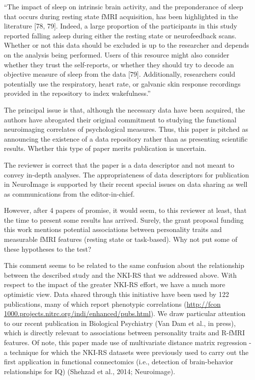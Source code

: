 \documentclass{article}
\newcommand{\RESPONSE}[1]{\textcolor{responseblue}{#1}}
\begin{document}
\RESPONSE{``The impact of sleep on intrinsic brain activity, and the preponderance of sleep that occurs during resting state fMRI acquisition, has been highlighted in the literature  [78, 79]. Indeed, a large proportion of the participants in this  study  reported  falling  asleep during either the resting state or neurofeedback scans. Whether or not this  data should be excluded is up to the researcher and depends on the analysis being performed. Users of this resource might also consider whether they trust the self-reports, or whether they should try to decode an objective measure of sleep from the data [79]. Additionally, researchers could potentially use the respiratory, heart rate, or galvanic skin response recordings provided in the repository to index wakefulness.''}

The principal issue is that, although the necessary data have been acquired, the authors have abrogated their original commitment to studying the functional neuroimaging correlates of psychological measures. Thus, this paper is pitched as announcing the existence of a data repository rather than as presenting scientific results. Whether this type of paper merits publication is uncertain.

\RESPONSE{The reviewer is correct that the paper is a data descriptor and not meant to convey in-depth analyses. The appropriateness of data descriptors for publication in NeuroImage is supported by their recent special issues on data sharing as well as communications from the editor-in-chief.}

However, after 4 papers of promise, it would seem, to this reviewer at least, that the time to present some results has arrived. Surely, the grant proposal funding this work mentions potential associations between
personality traits and measurable fMRI features (resting state or task-based). Why not put some of these hypotheses to the test? 

\RESPONSE{This comment seems to be related to the same confusion about the relationship between the described study and the NKI-RS that we addressed above. With respect to the impact of the greater NKI-RS effort, we have a much more optimistic view. Data shared through this initiative have been used by 122 publications, many of which report phenotypic correlations (\url{http://fcon 1000.projects.nitrc.org/indi/enhanced/pubs.html}). We draw particular attention to our recent publication in Biological Psychiatry (Van Dam et al., in press), which is directly relevant to associations between personality traits and R-fMRI features. Of note, this paper made use of multivariate distance matrix regression - a technique for which the NKI-RS datasets were previously used to carry out the first application in functional connectomics (i.e., detection of brain-behavior relationships for IQ) (Shehzad et al., 2014; Neuroimage).}
\end{document}
